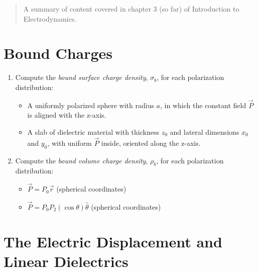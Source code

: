 \documentclass[10pt]{article}
\begin{document}
\maketitle

\begin{abstract}
A summary of content covered in chapter 3 (so far) of Introduction to Electrodynamics. 
\end{abstract}
\noindent

\section{Bound Charges}

\begin{enumerate}
\item Compute the \textit{bound surface charge density}, $\sigma_b$, for each polarization distribution:
\begin{itemize}
\item A uniformly polarized sphere with radius $a$, in which the constant field $\vec{P}$ is aligned with the z-axis.
\item A slab of dielectric material with thickness $z_0$ and lateral dimensions $x_0$ and $y_0$, with uniform $\vec{P}$ inside, oriented along the z-axis.
\end{itemize} \vspace{2cm}
\item Compute the \textit{bound volume charge density}, $\rho_b$, for each polarization distribution:
\begin{itemize}
\item $\vec{P} = P_0\vec{r}$ (spherical coordinates)
\item $\vec{P} = P_0 P_2(\cos\theta) \hat{\theta}$ (spherical coordinates)
\end{itemize} \vspace{3cm}
\end{enumerate}

\section{The Electric Displacement and Linear Dielectrics}
\end{document}
